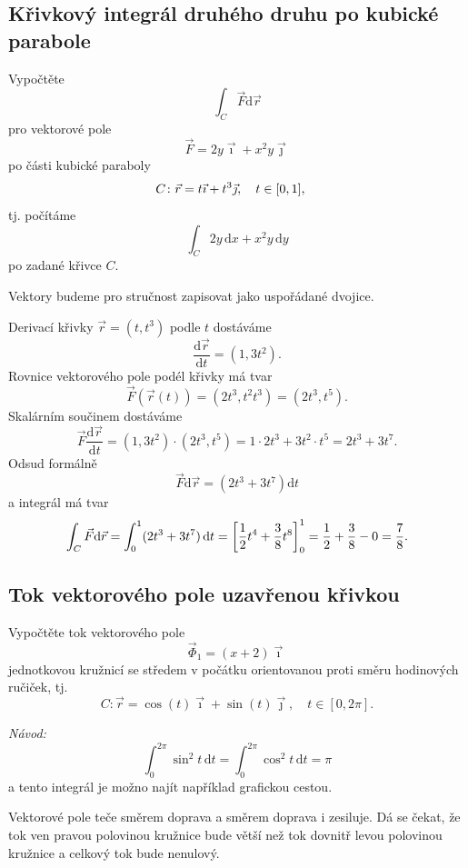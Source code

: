 \konec

\stranka


\subsection{Křivkový integrál druhého druhu po kubické parabole}


Vypočtěte $$\int_{C} \vec F \mathrm d\vec r$$ pro vektorové pole $$\vec F=2y\vec \imath + x^2y\vec\jmath$$ po části kubické paraboly
\begin{align*}
  C&\colon \vec r=t\vec \imath + t^3\vec\jmath, \quad t\in\qty[0,1],
\end{align*}
tj. počítáme
$$\int_C 2y\,\mathrm dx + x^2y\,\mathrm dy$$
po zadané křivce $C$.

\reseni

Vektory budeme pro stručnost zapisovat jako uspořádané dvojice.

\stranka

Derivací křivky $\vec r=(t,t^3)$ podle $t$ dostáváme
$$\frac{\mathrm d\vec r}{\mathrm dt}=(1,3t^2).$$
Rovnice vektorového pole podél křivky má tvar
$$\vec F(\vec r(t))=(2t^3,t^2t^3)=(2t^3,t^5).$$
Skalárním součinem dostáváme
$$\vec F \frac{\mathrm d\vec r}{\mathrm dt}=
(1,3t^2)\cdot (2t^3,t^5) = 1\cdot 2t^3+3t^2\cdot t^5=2t^3+3t^7.
$$
Odsud formálně $$\vec F\mathrm d\vec r=(2t^3+3t^7)\mathrm dt$$
a integrál má tvar
$$\int_C\vec F\mathrm d\vec r=\int_0^{1}(2t^3+3t^7)\,\mathrm dt
=\qty[\frac 12 t^4 + \frac 38 t^8]_0^1=\frac 12 +\frac 38 - 0 = \frac 78.$$

\konec


\stranka



\subsection{Tok vektorového pole uzavřenou křivkou}

Vypočtěte tok vektorového pole $$\vec \Phi_1=(x+2)\vec\imath$$ jednotkovou kružnicí se středem v počátku orientovanou proti směru hodinových ručiček, tj. $$C\colon \vec r=\cos(t)\vec \imath+\sin(t)\vec\jmath, \quad t\in[0,2\pi].$$


\textit{Návod:} $$\int_0^{2\pi}\sin^2 t\,\mathrm dt=\int_0^{2\pi}\cos^2 t\,\mathrm dt= \pi$$
a tento integrál je možno najít například grafickou cestou.

\reseni
Vektorové pole teče směrem doprava a směrem doprava i zesiluje. Dá se čekat, že tok ven pravou polovinou kružnice bude větší než tok dovnitř levou polovinou kružnice a celkový tok bude nenulový.

